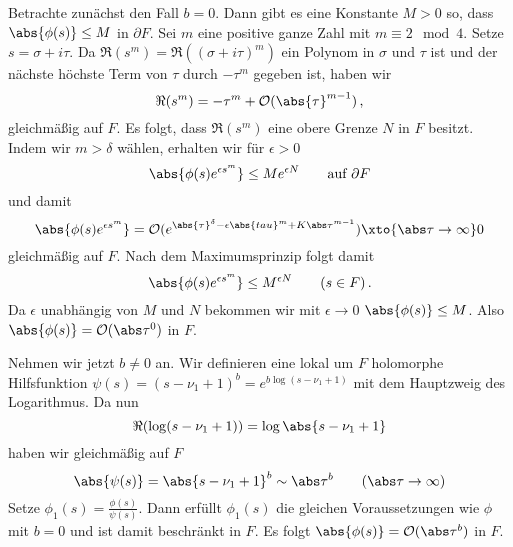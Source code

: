 \begin{bewe}
\begin{bewe}
		Betrachte zunächst den Fall $b=0$.
		Dann gibt es eine Konstante $M > 0$ so, dass $\abs{\phi(s)} \leq M$ in $\partial F$.
		Sei $m$ eine positive ganze Zahl mit $m \equiv 2 \mod 4$.
		Setze $s = \sigma +i\tau$.
		Da $\Re(s^m) = \Re((\sigma + i\tau)^m) $ ein Polynom in $\sigma$ und $\tau$ ist und der nächste höchste Term von $\tau$ durch $-\tau^m$ gegeben ist, haben wir
		\[
			\Re(s^m) = -\tau^m + \mathcal{O} (\abs{\tau}^{m-1})\,,
		\]
		gleichmäßig auf $F$.
		Es folgt, dass $\Re(s^m)$ eine obere Grenze $N$ in $F$ besitzt.
		Indem wir $m > \delta$ wählen, erhalten wir für $\epsilon > 0$
		\[
			\abs{\phi(s)e^{\epsilon s^m}} \leq Me^{\epsilon N}
			\qquad \text{auf } \partial F
		\]
		und damit
		\[
			\abs{\phi(s) e^{\epsilon s^m}}
			= \mathcal{O} ( e^{\abs{\tau}^\delta - \epsilon\abs{tau}^m + K\abs\tau^{m-1}})
			\xto{\abs\tau \to \infty} 0
		\]
		gleichmäßig auf $F$.
		Nach dem Maximumsprinzip folgt damit 
		\[
			\abs{\phi(s)e^{\epsilon s^m}}
			\leq M^{\epsilon N}
			\qquad (s\in F)
			\,.
		\]
		Da $\epsilon$ unabhängig von $M$ und $N$ bekommen wir mit $\epsilon \to 0$ $\abs{\phi(s)} \leq M$.
		Also $\abs{\phi(s)} = \mathcal{O}(\abs\tau^0)$ in $F$.
		
		Nehmen wir jetzt $b \not= 0$ an.
		Wir definieren eine lokal um $F$ holomorphe Hilfsfunktion $\psi(s) = (s-\nu_1 +1)^b = e^{b\log(s-\nu_1+1)}$ mit dem Hauptzweig des Logarithmus.
		Da nun
		\[
			\Re(\log(s-\nu_1 + 1))
			= \log\abs{s-\nu_1+1}
		\]
		haben wir gleichmäßig auf $F$
		\[
			\abs{\psi(s)} = \abs{s - \nu_1 + 1}^b \sim \abs\tau^b \qquad (\abs\tau \to \infty)
		\]
		Setze $\phi_1(s) = \frac{\phi(s)}{\psi(s)}$.
		Dann erfüllt $\phi_1(s)$ die gleichen Voraussetzungen wie $\phi$ mit $b=0$ und ist damit beschränkt in $F$.
		Es folgt $\abs{\phi(s)} = \mathcal{O}(\abs\tau^b)$ in $F$.
	\end{bewe}


\end{bewe}
